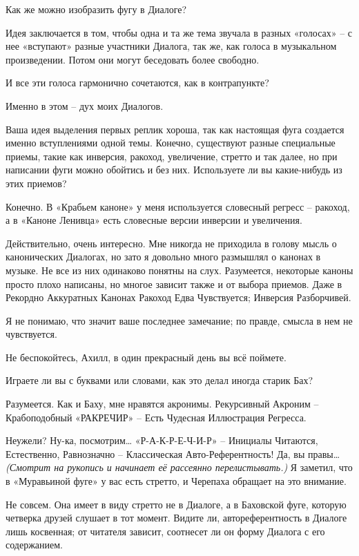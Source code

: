 \documentclass[../main.tex]{subfiles}
\begin{document}
\begin{dialogue}
 Как же можно изобразить фугу в Диалоге?

 Идея заключается в том, чтобы одна и та же тема звучала в разных «голосах» \--- с нее «вступают» разные участники Диалога, так же, как голоса в музыкальном произведении. Потом они могут беседовать более свободно.

 И все эти голоса гармонично сочетаются, как в контрапункте?

 Именно в этом \--- дух моих Диалогов.

 Ваша идея выделения первых реплик хороша, так как настоящая фуга создается именно вступлениями одной темы. Конечно, существуют разные специальные приемы, такие как инверсия, ракоход, увеличение, стретто и так далее, но при написании фуги можно обойтись и без них. Используете ли вы какие-нибудь из этих приемов?

 Конечно. В «Крабьем каноне» у меня используется словесный регресс \--- ракоход, а в «Каноне Ленивца» есть словесные версии инверсии и увеличения.

 Действительно, очень интересно. Мне никогда не приходила в голову мысль о канонических Диалогах, но зато я довольно много размышлял о канонах в музыке. Не все из них одинаково понятны на слух. Разумеется, некоторые каноны просто плохо написаны, но многое зависит также и от выбора приемов. Даже в Рекордно Аккуратных Канонах Ракоход Едва Чувствуется; Инверсия Разборчивей.

 Я не понимаю, что значит ваше последнее замечание; по правде, смысла в нем не чувствуется.

 Не беспокойтесь, Ахилл, в один прекрасный день вы всё поймете.

 Играете ли вы с буквами или словами, как это делал иногда старик Бах?

 Разумеется. Как и Баху, мне нравятся акронимы. Рекурсивный Акроним \--- Крабоподобный «РАКРЕЧИР» \--- Есть Чудесная Иллюстрация Регресса.

 Неужели? Ну-ка, посмотрим\ldots{} «Р-А-К-Р-Е-Ч-И-Р» \--- Инициалы Читаются, Естественно, Равнозначно \--- Классическая Авто-Референтность! Да, вы правы\ldots{} \emph{(Смотрит на рукопись и начинает её рассеянно перелистывать.)} Я заметил, что в «Муравьиной фуге» у вас есть стретто, и Черепаха обращает на это внимание.

 Не совсем. Она имеет в виду стретто не в Диалоге, а в Баховской фуге, которую четверка друзей слушает в тот момент. Видите ли, автореферентность в Диалоге лишь косвенная; от читателя зависит, соотнесет ли он форму Диалога с его содержанием.


\end{dialogue}
\end{document}
